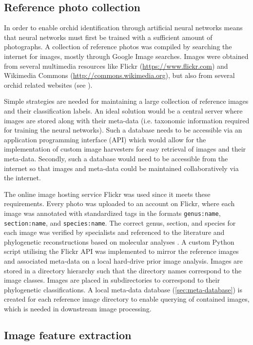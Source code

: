 \documentclass[twocolumn]{bmcart}
\begin{document}
\subsection{Reference photo collection}

In order to enable orchid identification through artificial neural networks means that neural networks must first be trained with a sufficient amount of photographs. A collection of reference photos was compiled by searching the internet for images, mostly through Google Image searches. Images were obtained from several multimedia resources like Flickr (\url{https://www.flickr.com}) and Wikimedia Commons (\url{http://commons.wikimedia.org}), but also from several orchid related websites (see ).

Simple strategies are needed for maintaining a large collection of reference images and their classification labels. An ideal solution would be a central server where images are stored along with their meta-data (i.e. taxonomic information required for training the neural networks). Such a database needs to be accessible via an application programming interface (API) which would allow for the implementation of custom image harvesters for easy retrieval of images and their meta-data. Secondly, such a database would need to be accessible from the internet so that images and meta-data could be maintained collaboratively via the internet.

The online image hosting service Flickr was used since it meets these requirements. Every photo was uploaded to an account on Flickr, where each image was annotated with standardized tags in the formats \verb/genus:name/, \verb/section:name/, and \verb/species:name/. The correct genus, section, and species for each image was verified by specialists and referenced to the literature \cite{Cribb1998, Pridgeon1999, Frosch2012} and phylogenetic reconstructions based on molecular analyses \cite{Li2011, Chochai2012}. A custom Python script utilising the Flickr API was implemented to mirror the reference images and associated meta-data on a local hard-drive prior image analysis. Images are stored in a directory hierarchy such that the directory names correspond to the image classes. Images are placed in subdirectories to correspond to their phylogenetic classifications. A local meta-data database (\ref{sec:meta-database}) is created for each reference image directory to enable querying of contained images, which is needed in downstream image processing.

\subsection{Image feature extraction}
\end{document}
